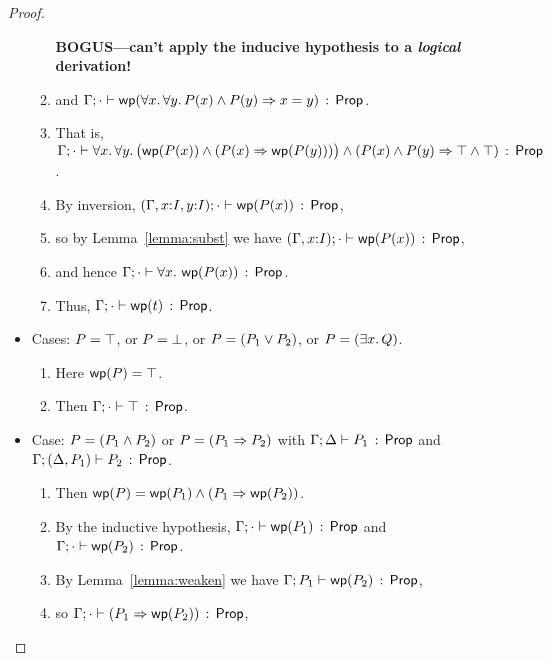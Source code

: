 \documentclass[10pt,a4paper]{article}
\begin{document}
\begin{proof}
\begin{itemize}
\begin{enumerate}
{\bf BOGUS---can't apply the inducive hypothesis to a {\it logical} derivation!
}
      \item 
      	and
        $\Gamma;\cdot \vdash \mathop{\mathsf{wp}}(\forall x.\, \forall y.\, P(x) \wedge P(y) \Rightarrow x=y)\, :\, \mathsf{Prop}$.
      \item
      	That is, 
	$\Gamma;\cdot \vdash \forall x.\, \forall y.\, \bigl(\mathop{\mathsf{wp}}(P(x)) \wedge (P(x) \Rightarrow \mathop{\mathsf{wp}}(P(y)))\bigr) \wedge (P(x) \wedge P(y) \Rightarrow \top \wedge \top)\, :\, \mathsf{Prop}$.
	  \item
	    By inversion, 
	      $(\Gamma,x{:}I,y{:}I);\cdot \vdash \mathop{\mathsf{wp}}(P(x))\, :\, \mathsf{Prop}$,
      \item 
        so by Lemma~\ref{lemma:subst} we have 
        $(\Gamma,x{:}I);\cdot \vdash \mathop{\mathsf{wp}}(P(x))\, :\, \mathsf{Prop}$,
      \item
        and hence $\Gamma;\cdot \vdash \forall x.\, \mathop{\mathsf{wp}}(P(x))\, :\, \mathsf{Prop}$.
      \item
        Thus, $\Gamma;\cdot \vdash \mathop{\mathsf{wp}}(t)\, :\, \mathsf{Prop}$.
      \end{enumerate}
      
  \item Cases: $P = \top$, or $P = \bot$, or $P=(P_1 \vee P_2)$,
      or $P=(\exists x.\, Q)$.
      \begin{enumerate}
      \item 
      	Here $\mathop{\mathsf{wp}}(P) = \top$.
      \item
        Then $\Gamma;\cdot \vdash \top\, :\, \mathsf{Prop}$.
      \end{enumerate}
            
  \item Case: $P = (P_1 \wedge P_2)$ or $P = (P_1 \Rightarrow P_2)$ with
       $\Gamma;\Delta \vdash P_1\, :\, \mathsf{Prop}$ and 
              $\Gamma;(\Delta,P_1) \vdash P_2\, :\, \mathsf{Prop}$.
       \begin{enumerate}
       \item 
       		Then $\mathop{\mathsf{wp}}(P) = \mathop{\mathsf{wp}}(P_1) \wedge (P_1 \Rightarrow \mathop{\mathsf{wp}}(P_2))$.
       \item 
       		By the inductive hypothesis,
         	$\Gamma;\cdot \vdash \mathop{\mathsf{wp}}(P_1)\, :\, \mathsf{Prop}$
         	and $\Gamma;\cdot \vdash \mathop{\mathsf{wp}}(P_2)\, :\, \mathsf{Prop}$.
       \item 
         By Lemma~\ref{lemma:weaken} we have 
         $\Gamma;P_1 \vdash \mathop{\mathsf{wp}}(P_2)\, :\, \mathsf{Prop}$,
       \item so $\Gamma;\cdot \vdash (P_1 \Rightarrow \mathop{\mathsf{wp}}(P_2))\, :\, \mathsf{Prop}$,



\end{enumerate}
\end{itemize}
\end{proof}
\end{document}
